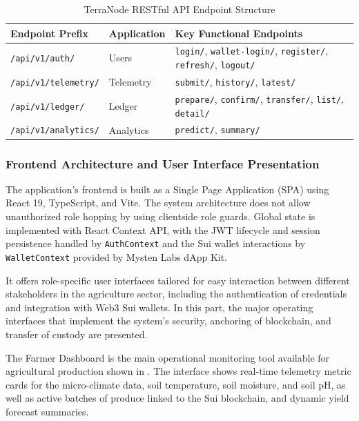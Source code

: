 \begin{table}[H]
\centering
\small
\singlespacing
\renewcommand{\arraystretch}{1.15}
\caption{TerraNode RESTful API Endpoint Structure}
\label{tab:api_endpoints}
\begin{tabularx}{\textwidth}{|l|l|>{\raggedright\arraybackslash}X|}
\hline
\textbf{Endpoint Prefix} & \textbf{Application} & \textbf{Key Functional Endpoints} \\
\hline
\texttt{/api/v1/auth/} & Users & \texttt{login/}, \texttt{wallet-login/}, \texttt{register/}, \texttt{refresh/}, \texttt{logout/} \\
\hline
\texttt{/api/v1/telemetry/} & Telemetry & \texttt{submit/}, \texttt{history/}, \texttt{latest/} \\
\hline
\texttt{/api/v1/ledger/} & Ledger & \texttt{prepare/}, \texttt{confirm/}, \texttt{transfer/}, \texttt{list/}, \texttt{detail/} \\
\hline
\texttt{/api/v1/analytics/} & Analytics & \texttt{predict/}, \texttt{summary/} \\
\hline
\end{tabularx}
\end{table}

\subsubsection*{Frontend Architecture and User Interface Presentation}

The application's frontend is built as a Single Page Application (SPA) using React 19, TypeScript, and Vite. The system architecture does not allow unauthorized role hopping by using clientside role guards. Global state is implemented with React Context API, with the JWT lifecycle and session persistence handled by \texttt{AuthContext} and the Sui wallet interactions by \texttt{WalletContext} provided by Mysten Labs dApp Kit.

It offers role-specific user interfaces tailored for easy interaction between different stakeholders in the agriculture sector, including the authentication of credentials and integration with Web3 Sui wallets. In this part, the major operating interfaces that implement the system's security, anchoring of blockchain, and transfer of custody are presented.

The Farmer Dashboard is the main operational monitoring tool available for agricultural production shown in . The interface shows real-time telemetry metric cards for the micro-climate data, soil temperature, soil moisture, and soil pH, as well as active batches of produce linked to the Sui blockchain, and dynamic yield forecast summaries.

